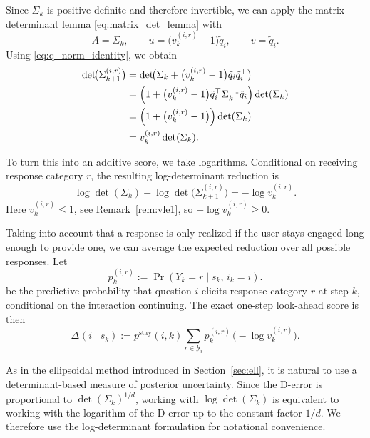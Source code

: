 \documentclass{article}
\begin{document}
Since $\Sigma_k$ is positive definite and therefore invertible, we can apply the matrix determinant lemma
\eqref{eq:matrix_det_lemma} with
\begin{equation*}
A=\Sigma_k,
\qquad
u=\bigl(v_k^{(i,r)}-1\bigr)\tilde q_i,
\qquad
v=\tilde q_i.
\end{equation*}
Using \eqref{eq:q_norm_identity}, we obtain
\begin{align*}
\det\!\bigl(\Sigma_{k+1}^{(i,r)}\bigr)
&=
\det\!\bigl(\Sigma_k+\bigl(v_k^{(i,r)}-1\bigr)\tilde q_i\tilde q_i^\top\bigr) \\
&=
\Bigl(1+\bigl(v_k^{(i,r)}-1\bigr)\tilde q_i^\top\Sigma_k^{-1}\tilde q_i\Bigr)\det(\Sigma_k) \\
&=
\Bigl(1+\bigl(v_k^{(i,r)}-1\bigr)\Bigr)\det(\Sigma_k) \\
&=
v_k^{(i,r)}\det(\Sigma_k).
\end{align*}

To turn this into an additive score, we take logarithms. Conditional on receiving response category $r$, the resulting
log-determinant reduction is
\begin{equation*}
\log\det(\Sigma_k)-\log\det\!\bigl(\Sigma_{k+1}^{(i,r)}\bigr)
=
-\log v_k^{(i,r)}.
\end{equation*}
Here $v_k^{(i,r)}\leq 1$, see Remark~\ref{rem:vle1}, so $-\log v_k^{(i,r)} \geq 0$.

Taking into account that a response is only realized if the user stays engaged long enough to provide one, we can average the expected reduction over all possible responses. Let 
\begin{equation*}
p_k^{(i,r)} := \Pr(Y_k=r \mid s_k,\, i_k=i).
\end{equation*}
be the predictive probability that question $i$ elicits response
category $r$ at step $k$, conditional on the interaction continuing.
The exact one-step look-ahead score is then
\begin{equation}\label{eq:exact}
\Delta_{ }(i\mid s_k)
:=
p^{ \text{stay}}(i,k)
\sum_{r\in\mathcal Y_i}
p_k^{(i,r)}\,\bigl(-\log v_k^{(i,r)}\bigr).
\end{equation}

As in the ellipsoidal method introduced in Section~\ref{sec:ell}, it is natural to use a determinant-based measure of posterior uncertainty. Since the D-error is proportional to $\det(\Sigma_k)^{1/d}$, working with $\log\det(\Sigma_k)$ is equivalent to working with the logarithm of the D-error up to the constant factor $1/d$. We therefore use the log-determinant formulation for notational convenience.
\end{document}
